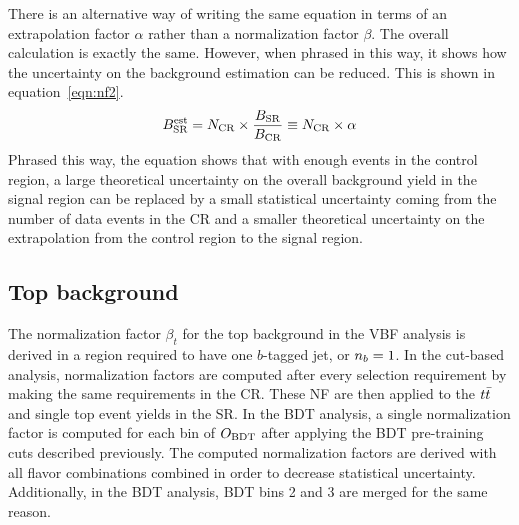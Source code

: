There is an alternative way of writing the same equation in terms of an extrapolation factor $\alpha$ rather than a normalization factor $\beta$. The overall calculation is exactly the same. However, when phrased in this way, it shows how the uncertainty on the background estimation can be reduced. This is shown in equation~\ref{eqn:nf2}.
%
\begin{equation}
B_{\rm SR}^{\rm est} = N_{\rm CR} \times \frac{B_{\rm SR}}{B_{\rm CR}} \equiv N_{\rm CR} \times \alpha
\label{eqn:nf2}
\end{equation}
%
Phrased this way, the equation shows that with enough events in the control region, a large theoretical uncertainty on the overall background yield in the signal region can be replaced by a small statistical uncertainty coming from the number of data events in the CR and a smaller theoretical uncertainty on the extrapolation from the control region to the signal region. 

\subsection{Top background}
\label{sec:topnf}
The normalization factor $\beta_{t}$ for the top background in the VBF analysis is derived in a region required to have one $b$-tagged jet, or $n_b = 1$. In the cut-based analysis, normalization factors are computed after every selection requirement by making the same requirements in the CR. These NF are then applied to the $t\bar{t}$ and single top event yields in the SR. In the BDT analysis, a single normalization factor is computed for each bin of $O_{\rm BDT}$ after applying the BDT pre-training cuts described previously. The computed normalization factors are derived with all flavor combinations combined in order to decrease statistical uncertainty. Additionally, in the BDT analysis, BDT bins 2 and 3 are merged for the same reason.

